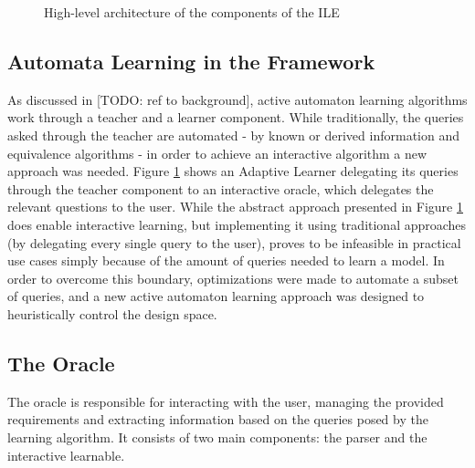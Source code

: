 \begin{figure}[!ht] 
	\centering
	\caption{High-level architecture of the components of the ILE} 
	\label{fig_architcture_ileoverview}
\end{figure}

\subsection{Automata Learning in the Framework} \label{subs_automatalearningintheframework}
As discussed in [TODO: ref to background], active automaton learning algorithms work through a teacher and a learner component. While traditionally, the queries asked through the teacher are automated - by known or derived information and equivalence algorithms - in order to achieve an interactive algorithm a new approach was needed. Figure \ref{fig_architcture_ileoverview} shows an Adaptive Learner delegating its queries through the teacher  component to an interactive oracle, which delegates the relevant questions to the user. While the abstract approach presented in Figure \ref{fig_architcture_ileoverview} does enable interactive learning, but implementing it using traditional approaches (by delegating every single query to the user), proves to be infeasible in practical use cases simply because of the amount of queries needed to learn a model. In order to overcome this boundary, optimizations were made to automate a subset of queries, and a new active automaton learning approach was designed to heuristically control the design space.

\subsection{The Oracle} \label{subs_oracle}
The oracle is responsible for interacting with the user, managing the provided requirements and extracting information based on the queries posed by the learning algorithm. It consists of two main components: the parser and the interactive learnable.

